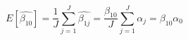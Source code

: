 \begin{equation}
\label{avgest}
E[\hat{\beta_{10}}] = \frac{1}{J}\sum\limits_{j=1}^J{\hat{\beta_{1j}}} = \frac{\beta_{10}}{J}\sum\limits_{j=1}^J{\alpha_j} = \beta_{10}\alpha_0
\end{equation}